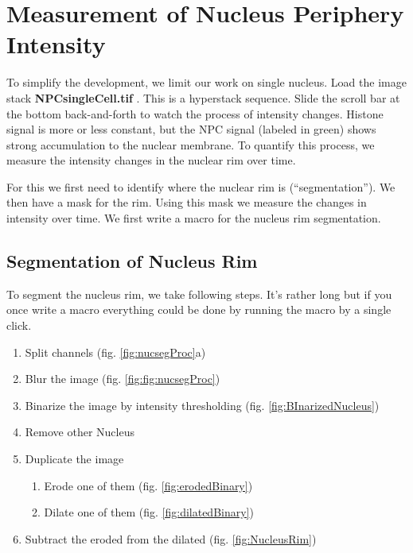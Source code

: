 \section{Measurement of Nucleus Periphery Intensity}

To simplify the development, we limit our work on single nucleus. Load the image stack \textbf{NPCsingleCell.tif} . This is a hyperstack sequence. Slide the scroll bar at the bottom back-and-forth to watch the process of intensity changes. Histone signal is more or less constant, but the NPC signal (labeled in green) shows strong accumulation to the nuclear membrane. To quantify this process, we measure the intensity changes in the nuclear rim over time.

For this we first need to identify where the nuclear rim is (``segmentation''). We then have a mask for the rim. Using this mask we measure the changes in intensity over time. We first write a macro for the nucleus rim segmentation.

\subsection{Segmentation of Nucleus Rim}

To segment the nucleus rim, we take following steps. It's rather long but if you once write a macro everything could be done by running the macro by a single click.

\begin{enumerate}
    \item Split channels (fig. \ref{fig:nucsegProc}a)
    \item Blur the image (fig. \ref{fig:fig:nucsegProc})
    \item Binarize the image by intensity thresholding (fig. \ref{fig:BInarizedNucleus})
    \item Remove other Nucleus
    \item Duplicate the image

    \begin{enumerate}
        \item Erode one of them (fig. \ref{fig:erodedBinary})
        \item Dilate one of them (fig. \ref{fig:dilatedBinary})

    \end{enumerate}
    \item Subtract the eroded from the dilated (fig. \ref{fig:NucleusRim})

\end{enumerate}